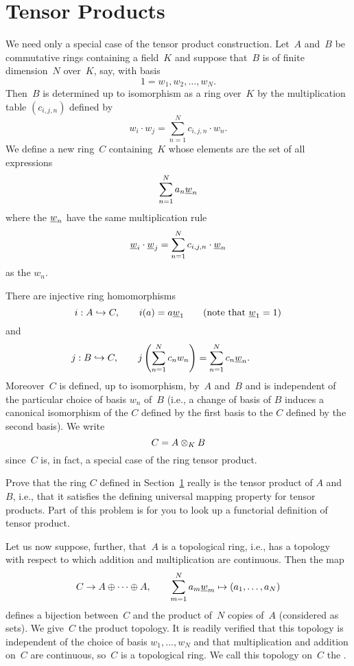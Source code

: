 \section{Tensor Products} \label{sec:tensor}
We need only a special case of the tensor product construction.
Let~$A$ and~$B$ be commutative rings containing a field~$K$ and suppose that~$B$ is of finite dimension~$N$ over~$K$, say, with basis 
$$
  1=w_1, w_2, \ldots, w_N.
$$
Then~$B$ is determined up to isomorphism as a ring over~$K$
by the multiplication table $(c_{i,j,n})$ defined by
$$
   w_i \cdot w_j = \sum_{n=1}^N c_{i,j,n} \cdot w_n.
$$
We define a new ring~$C$ containing~$K$ whose elements are 
the set of all expressions
$$
\sum_{n=1}^N a_n \underline{w}_n
$$
where the $\underline{w}_n$ have the same multiplication rule
$$
   \underline{w}_i \cdot \underline{w}_j = \sum_{n=1}^N c_{i,j,n} \cdot \underline{w}_n
$$
as the $w_n$. 

There are injective ring homomorphisms
$$  
i:A\hookrightarrow C, \qquad i(a) = a \underline{w}_1  \qquad \text{(note that $\underline{w}_1=1$)}
$$
and 
$$
j:B\hookrightarrow C, \qquad j\left(\sum_{n=1}^N c_n w_n\right) = \sum_{n=1}^N c_n \underline{w}_n.
\qquad\quad\,\,\,\,\mbox{}
$$
Moreover~$C$ is defined, up to isomorphism, by~$A$ and~$B$ and is
independent of the particular choice of basis $w_n$ of~$B$ (i.e., a
change of basis of $B$ induces a canonical isomorphism of the $C$
defined by the first basis to the $C$ defined by the second basis).
We write
$$
  C = A\otimes_K B
$$
since~$C$ is, in fact, a special case of the ring tensor product.

\begin{exercise}\label{ex:normed2}
Prove that the ring $C$ defined in Section~\ref{sec:tensor} really is the tensor
product of $A$ and $B$, i.e., that it satisfies the defining universal
mapping property for tensor products.  Part of this problem is for you
to look up a functorial definition of tensor product.
\end{exercise}



Let us now suppose, further, that~$A$ is a topological ring, i.e., has
a topology with respect to which addition and multiplication are
continuous.  Then the map 
$$
C\to A \oplus \cdots \oplus A,\qquad
  \sum_{m=1}^N a_m \underline{w}_m \mapsto (a_1,\ldots, a_N)
$$
defines a bijection between~$C$ and the product of~$N$ copies of~$A$
(considered as sets). We give~$C$ the product topology.  It is readily
verified that this topology is independent of the choice of basis
$w_1, \ldots, w_N$ and that multiplication and addition on~$C$ are
continuous, so~$C$ is a topological ring.  We call this topology
on~$C$ the .

